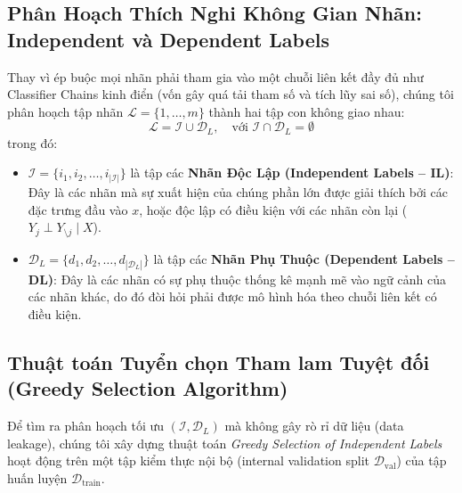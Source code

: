 \documentclass[11pt,a4paper]{article}
\begin{document}
\subsection{Phân Hoạch Thích Nghi Không Gian Nhãn: Independent và Dependent Labels}
Thay vì ép buộc mọi nhãn phải tham gia vào một chuỗi liên kết đầy đủ như Classifier Chains kinh điển (vốn gây quá tải tham số và tích lũy sai số), chúng tôi phân hoạch tập nhãn $\mathcal{L} = \{1, \dots, m\}$ thành hai tập con không giao nhau:
\begin{equation}
\mathcal{L} = \mathcal{I} \cup \mathcal{D}_L, \quad \text{với } \mathcal{I} \cap \mathcal{D}_L = \emptyset
\end{equation}
trong đó:
\begin{itemize}
    \item $\mathcal{I} = \{i_1, i_2, \dots, i_{|\mathcal{I}|}\}$ là tập các \textbf{Nhãn Độc Lập (Independent Labels -- IL)}: Đây là các nhãn mà sự xuất hiện của chúng phần lớn được giải thích bởi các đặc trưng đầu vào $x$, hoặc độc lập có điều kiện với các nhãn còn lại ($Y_j \perp Y_{\setminus j} \mid X$).
    \item $\mathcal{D}_L = \{d_1, d_2, \dots, d_{|\mathcal{D}_L|}\}$ là tập các \textbf{Nhãn Phụ Thuộc (Dependent Labels -- DL)}: Đây là các nhãn có sự phụ thuộc thống kê mạnh mẽ vào ngữ cảnh của các nhãn khác, do đó đòi hỏi phải được mô hình hóa theo chuỗi liên kết có điều kiện.
\end{itemize}

\subsection{Thuật toán Tuyển chọn Tham lam Tuyệt đối (Greedy Selection Algorithm)}
Để tìm ra phân hoạch tối ưu $(\mathcal{I}, \mathcal{D}_L)$ mà không gây rò rỉ dữ liệu (data leakage), chúng tôi xây dựng thuật toán \textit{Greedy Selection of Independent Labels} hoạt động trên một tập kiểm thực nội bộ (internal validation split $\mathcal{D}_{\mathrm{val}}$) của tập huấn luyện $\mathcal{D}_{\mathrm{train}}$.
\end{document}
